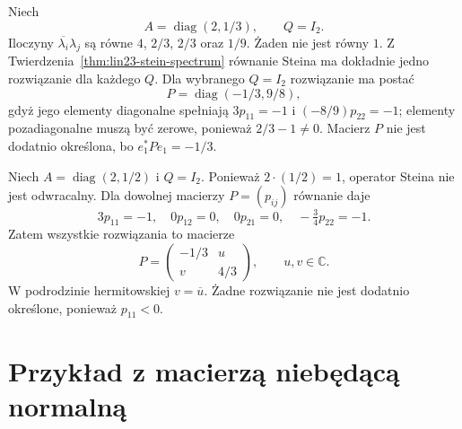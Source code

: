 \begin{przyklad}
\label{prz:lin23-unique-unstable}
Niech
\[
 A=\operatorname{diag}(2,1/3),
 \qquad Q=I_2.
\]
Iloczyny
\(\overline{\lambda_i}\lambda_j\)
są równe \(4\), \(2/3\),
\(2/3\) oraz \(1/9\).
Żaden nie jest równy \(1\).
Z Twierdzenia~\ref{thm:lin23-stein-spectrum}
równanie Steina ma dokładnie
jedno rozwiązanie dla każdego \(Q\).
Dla wybranego \(Q=I_2\)
rozwiązanie ma postać
\[
 P=\operatorname{diag}(-1/3,9/8),
\]
gdyż jego elementy diagonalne
spełniają
\(3p_{11}=-1\)
i \((-8/9)p_{22}=-1\);
elementy pozadiagonalne
muszą być zerowe, ponieważ
\(2/3-1\ne0\).
Macierz \(P\) nie jest
dodatnio określona,
bo \(e_1^*Pe_1=-1/3\).
\end{przyklad}

\begin{przyklad}
\label{prz:lin23-resonance}
Niech
\(A=\operatorname{diag}(2,1/2)\)
i \(Q=I_2\).
Ponieważ \(2\cdot(1/2)=1\),
operator Steina nie jest
odwracalny. Dla dowolnej
macierzy \(P=(p_{ij})\)
równanie daje
\[
 3p_{11}=-1,\quad
 0p_{12}=0,\quad
 0p_{21}=0,\quad
 -\tfrac34p_{22}=-1.
\]
Zatem wszystkie rozwiązania
to macierze
\[
 P=\begin{pmatrix}
 -1/3&u\\v&4/3
 \end{pmatrix},\qquad u,v\in\mathbb C.
\]
W podrodzinie hermitowskiej
\(v=\overline u\).
Żadne rozwiązanie nie jest
dodatnio określone,
ponieważ \(p_{11}<0\).
\end{przyklad}

\section{Przykład z macierzą niebędącą normalną}
\label{sec:lin23-example}

